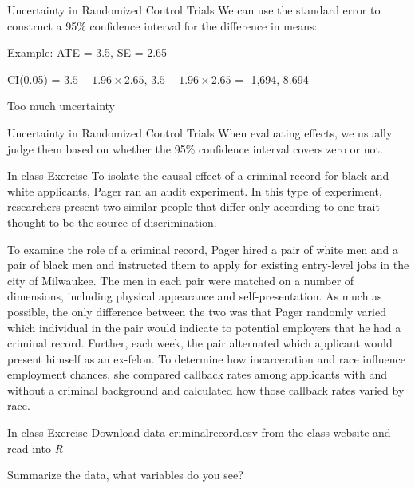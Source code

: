 \documentclass[presentation]{beamer}
\begin{document}
\begin{frame}[label={sec:orge3e0e80}]{Uncertainty in Randomized Control Trials}
We can use the standard error to construct a 95\% confidence interval for the difference in means:

Example: ATE = 3.5, SE = 2.65

CI(0.05) = \(3.5 - 1.96 \times 2.65\),  \(3.5 +  1.96 \times 2.65\) = -1,694, 8.694

\alert{Too much uncertainty}
\end{frame}


\begin{frame}[label={sec:org009b2df}]{Uncertainty in Randomized Control Trials}
When evaluating effects, we usually judge them based on whether the 95\% confidence interval covers zero or not.
\end{frame}


\begin{frame}[shrink=25,label={sec:org03d5b43}]{In class Exercise}
To isolate the causal effect of a criminal record for black and white applicants, Pager ran an audit experiment. In this type of experiment, researchers present two similar people that differ only according to one trait thought to be the source of discrimination.

To examine the role of a criminal record, Pager hired a pair of white men and a pair of black men and instructed them to apply for existing entry-level jobs in the city of Milwaukee. The men in each pair were matched on a number of dimensions, including physical appearance and self-presentation. As much as possible, the only difference between the two was that Pager randomly varied which individual in the pair would indicate to potential employers that he had a criminal record. Further, each week, the pair alternated which applicant would present himself as an ex-felon. To determine how incarceration and race influence employment chances, she compared callback rates among applicants with and without a criminal background and calculated how those callback rates varied by race.
\end{frame}

\begin{frame}[label={sec:orgc80bb60}]{In class Exercise}
Download data criminalrecord.csv from the class website and read into \emph{R}

Summarize the data, what variables do you see?
\end{frame}
\end{document}
